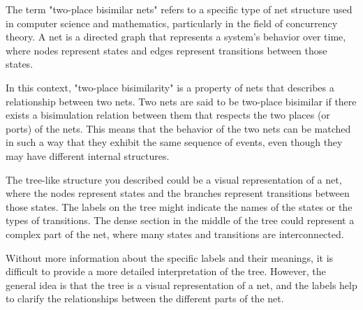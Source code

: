 The term "two-place bisimilar nets" refers to a specific type of net structure used in computer science and mathematics, particularly in the field of concurrency theory. A net is a directed graph that represents a system's behavior over time, where nodes represent states and edges represent transitions between those states.

In this context, "two-place bisimilarity" is a property of nets that describes a relationship between two nets. Two nets are said to be two-place bisimilar if there exists a bisimulation relation between them that respects the two places (or ports) of the nets. This means that the behavior of the two nets can be matched in such a way that they exhibit the same sequence of events, even though they may have different internal structures.

The tree-like structure you described could be a visual representation of a net, where the nodes represent states and the branches represent transitions between those states. The labels on the tree might indicate the names of the states or the types of transitions. The dense section in the middle of the tree could represent a complex part of the net, where many states and transitions are interconnected.

Without more information about the specific labels and their meanings, it is difficult to provide a more detailed interpretation of the tree. However, the general idea is that the tree is a visual representation of a net, and the labels help to clarify the relationships between the different parts of the net.